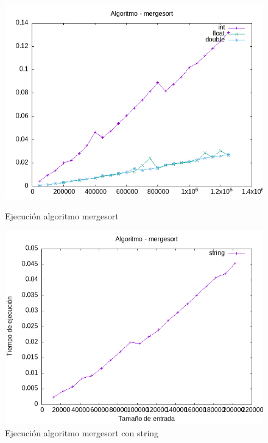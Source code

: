 \documentclass[11pt]{article}
\begin{document}
    \begin{figure}[H]
        \begin{minipage}{0.5\textwidth}
            \centering
            \includegraphics[width=\linewidth]{assets/Img/mergesort.png}
            \caption{Ejecución algoritmo mergesort}
            \label{fig:mergesort}
        \end{minipage}
        \begin{minipage}{0.5\textwidth}
            \centering
            \includegraphics[width=\linewidth]{assets/Img/mergesortstring.png}
            \caption{Ejecución algoritmo mergesort con string}
            \label{fig:quicksortstring}
        \end{minipage}
    \end{figure}
\end{document}
